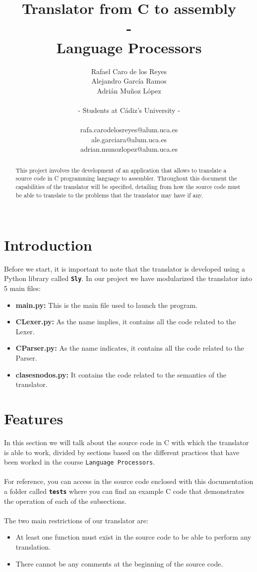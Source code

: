 \documentclass[]{article}
\title{\textbf{Translator from C to assembly \\ - \\ Language Processors}}
\author{Rafael Caro de los Reyes \\ Alejandro García Ramos \\ Adrián Muñoz López \\\\ - Students at Cádiz's University - \\\\ rafa.carodelosreyes@alum.uca.es \\ ale.garciara@alum.uca.es \\ adrian.munozlopez@alum.uca.es}
\begin{document}
	
	\maketitle
	
	\begin{abstract}
	This project involves the development of an application that allows to translate a source code in C programming language to assembler. Throughout this document the capabilities of the translator will be specified, detailing from how the source code must be able to translate to the problems that the translator may have if any.\\ \\
	\end{abstract}
	
	\section{Introduction}
        Before we start, it is important to note that the translator is developed using a Python library called \texttt{\textbf{Sly}}. In our project we have modularized the translator into 5 main files: \\ \begin{itemize}
        \item \textbf{main.py:} This is the main file used to launch the program.
        \item \textbf{CLexer.py:} As the name implies, it contains all the code related to the Lexer.
        \item \textbf{CParser.py:} As the name indicates, it contains all the code related to the Parser.
        \item \textbf{clasesnodos.py:} It contains the code related to the semantics of the translator.
        \end{itemize}

        \section{Features}
        In this section we will talk about the source code in C with which the translator is able to work, divided by sections based on the different practices that have been worked in the course \texttt{Language Processors}. \\\\ For reference, you can access in the source code enclosed with this documentation a folder called \texttt{\textbf{tests}} where you can find an example C code that demonstrates the operation of each of the subsections. \\\\ The two main restrictions of our translator are: \\ \begin{itemize}
        \item At least one function must exist in the source code to be able to perform any translation.
        \item There cannot be any comments at the beginning of the source code. \\
        \end{itemize}
\end{document}
